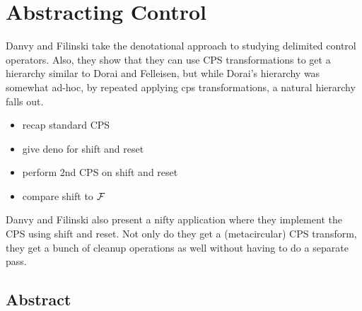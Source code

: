 \documentclass[letterpaper]{llncs}
\begin{document}
\section*{Abstracting Control}%

Danvy and Filinski take the denotational approach to studying delimited control operators. Also, they show that they can use CPS transformations to get a hierarchy similar to Dorai and Felleisen, but while Dorai's hierarchy was somewhat ad-hoc, by repeated applying cps transformations, a natural hierarchy falls out.

\begin{itemize}
	\item recap standard CPS
	\item give deno for shift and reset
	\item perform 2nd CPS on shift and reset
	\item compare shift to $ \mathcal{F} $
\end{itemize}

Danvy and Filinski also present a nifty application where they implement the CPS using shift and reset. Not only do they get a (metacircular) CPS transform, they get a bunch of cleanup operations as well without having to do a separate pass.



\subsection*{Abstract}






\end{document}
